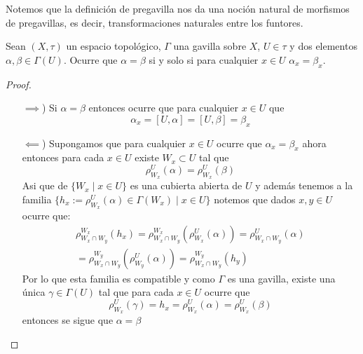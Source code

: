 \documentclass[14pt]{extarticle}
\begin{document}
Notemos que la definición de pregavilla
nos da una noción natural de morfismos de
pregavillas, es decir, transformaciones 
naturales entre los funtores.

\begin{lema}{}{}%
    Sean $(X,\tau)$ un espacio topológico,
    $\Gamma$ una gavilla sobre $X$, 
    $U\in \tau$ y dos elementos
    $\alpha,\beta \in \Gamma(U)$.
    Ocurre que $\alpha=\beta$
    si y solo si para cualquier $x\in U$
    $\alpha_x = \beta_x$.
\end{lema}%
\begin{proof}
    \begin{enumerate}
        \item[$\implies$)] Si $\alpha=\beta$
        entonces ocurre que para cualquier 
        $x\in U$ que 
        $$\alpha_x=[U,\alpha]=[U,\beta]=\beta_x$$
        \item[$\impliedby$)]Supongamos que para cualquier
        $x\in U$ ocurre que $\alpha_x=\beta_x$
        ahora entonces para cada $x\in U$ existe
        $W_x\subset U$ tal que 
        $$\rho_{W_x}^{U}(\alpha)= \rho_{W_x}^{U}(\beta)$$
        Asi que de $\{W_x\mid x\in U\}$ es una cubierta
        abierta de $U$ y además tenemos a la familia
        $\{h_x:=\rho_{W_x}^{U}(\alpha)\in \Gamma(W_x)\mid x\in U\}$
        notemos que dados $x, y \in U$ ocurre que:
        \begin{align*}
            \rho_{W_x\cap W_y}^{W_x}(h_x)
            =\rho_{W_x\cap W_y}^{W_x}(\rho_{W_x}^{U}(\alpha))
            =\rho_{W_x\cap W_y}^{U}(\alpha) \\
            =\rho_{W_x\cap W_y}^{W_y}(\rho_{W_y}^{U}(\alpha))
            =\rho_{W_x\cap W_y}^{W_y}(h_y)
        \end{align*}
        Por lo que esta familia es compatible y como
        $\Gamma$ es una gavilla, existe una única 
        $\gamma\in \Gamma(U)$ tal que 
        para cada $x\in U$ ocurre que 
        $$\rho_{W_x}^{U}(\gamma)=h_x=\rho_{W_x}^{U}(\alpha)= \rho_{W_x}^{U}(\beta)$$
        entonces se sigue que 
        $\alpha=\beta$
    \end{enumerate}
\end{proof}
\end{document}
